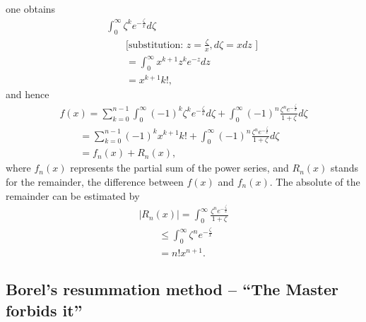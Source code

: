 {\begin{equation}
\label{2011-m-ch-dsee15}
\end{equation}
one obtains
\begin{equation}
\begin{split}
\int_0^\infty  \zeta^k  e^{-\frac{\zeta}{x}}   d\zeta     \\
\qquad \textrm{[substitution:  }z=\frac{\zeta}{x}, d \zeta =x dz  \textrm{ ]  } \\
\qquad = \int_0^\infty x^{k+1} z^k  e^{-z}   dz
\\
\qquad =  x^{k+1} k! ,
\end{split}
\label{2011-m-ch-dsee16}
\end{equation}
and hence
\begin{equation}
\begin{split}
f(x)  =
\sum_{k=0}^{n-1}\int_0^\infty (-1)^k \zeta^k  e^{-\frac{\zeta}{x}}   d\zeta
 +
\int_0^\infty (-1)^n \frac{\zeta^ne^{-\frac{\zeta}{x}}}{1+\zeta}
d\zeta  \\
\qquad =
\sum_{k=0}^{n-1}  (-1)^k x^{k+1} k!
 +
\int_0^\infty (-1)^n \frac{\zeta^ne^{-\frac{\zeta}{x}}}{1+\zeta}
d\zeta  \\
\qquad =
f_n(x)  +R_n(x),
\end{split}
\label{2011-m-ch-dsee17}
\end{equation}
where $f_n(x)$ represents the partial sum of the power series, and $R_n(x)$ stands for the remainder,
the difference between $f(x)$ and $f_n(x)$.
The absolute of the remainder can be estimated by
\begin{equation}
\begin{split}
\left| R_n(x)\right|
=
\int_0^\infty  \frac{\zeta^n e^{-\frac{\zeta}{x}}}{1+\zeta}\\
\qquad \le
\int_0^\infty  \zeta^n e^{-\frac{\zeta}{x}} \\
\qquad = n! x^{n+1}.
\end{split}
\label{2011-m-ch-dsee18}
\end{equation}\eproof
}


\subsection{Borel's resummation method -- ``The Master forbids it''}

